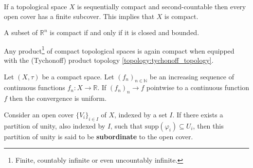 	\begin{theorem}
	    	If a topological space $X$ is sequentially compact and second-countable then every open cover has a finite subcover. This implies that $X$ is compact.
	\end{theorem}
	\begin{theorem}
    		A subset of $\mathbb{R}^n$ is compact if and only if it is closed and bounded.
	\end{theorem}
	
	\begin{theorem}
		Any product\footnote{Finite, countably infinite or even uncountably infinite.} of compact topological spaces is again compact when equipped with the (Tychonoff) product topology \ref{topology:tychonoff_topology}.
	\end{theorem}

    
	\begin{theorem}
    		Let $(X, \tau)$ be a compact space. Let $(f_n)_{n\in\mathbb{N}}$ be an increasing sequence of continuous functions $f_n:X\rightarrow\mathbb{R}$. If $(f_n)_n\rightarrow f$ pointwise to a continuous function $f$ then the convergence is uniform.
	\end{theorem}
    

 
	\begin{definition}
		Consider an open cover $\{V_i\}_{i\in I}$ of $X$, indexed by a set $I$. If there exists a partition of unity, also indexed by $I$, such that $\text{supp}(\varphi_i)\subseteq U_i$, then this partition of unity is said to be \textbf{subordinate} to the open cover.
	\end{definition}

